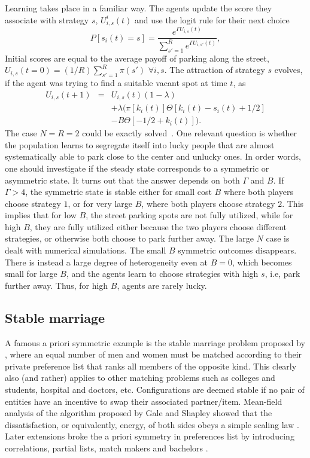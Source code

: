 \documentclass[aps,twocolumn,nofootinbib,sortedaddress,reprint]{revtex4-1}
\begin{document}
Learning takes place in a familiar way.  The agents update
the score they associate with strategy $s$,   $U_{i,s}^i(t)$ and use the logit rule for their next choice
\begin{equation}
P[s_i(t) = s]=\frac{e^{\Gamma U_{i,s}(t)}}{\sum_{s'=1}^R e^{\Gamma
  U_{i,s'}(t)}},
\end{equation}
Initial scores are equal to the average payoff of parking along the street, $U_{i,s}(t=0) =
(1/R) \sum_{s'=1}^R \pi(s')$ $\forall i,s$.  The attraction of
strategy $s$ evolves, if the agent was trying to find a suitable vacant spot at time $t$, as
\begin{eqnarray}
U_{i,s}(t+1)&=& U_{i,s}(t)(1-\lambda) \\\nonumber
&& + \lambda (\pi[k_i(t)]\Theta[k_i(t)-s_i(t)+1/2] \\\nonumber
&& -B\Theta [-1/2+k_i(t)]).
\end{eqnarray}
The case  $N=R=2$ could be exactly solved~\cite{Hanaki2011}. One relevant question is whether the
population learns to segregate itself into lucky people that are almost systematically able to park close to the center and unlucky ones. In order words, one should investigate if the steady state corresponds to a symmetric or asymmetric state. It turns out that the answer depends on both $\Gamma$ and $B$. If  $\Gamma > 4$, the
symmetric state is stable either for small cost $B$ where both players
choose strategy $1$, or for very large $B$, where both players choose
strategy $2$.  This implies that for low $B$, the street parking spots
are not fully utilized, while for high $B$, they are fully utilized
either because the two players choose different strategies, or
otherwise both choose to park further away. The large $N$ case is dealt with numerical simulations. The
small $B$ symmetric outcomes disappears. There is instead
a large degree of heterogeneity even at $B=0$, which becomes small
for large $B$, and the agents learn to choose strategies with high
$s$, i.e, park further away. Thus, for high $B$, agents are rarely lucky.



\subsection{Stable marriage}
\label{sec:marriage}
A famous a priori symmetric example is the stable marriage problem
proposed by \textcite{gale1962college}, \textcite{knuth1997stable} where an equal number of men
and women must be matched according to their private preference list
that ranks all members of the opposite kind. This clearly
  also (and rather) applies to other matching problems such as
  colleges and students, hospital and doctors, etc. Configurations
are deemed stable if no pair of entities have an incentive to swap
their associated partner/item.  Mean-field analysis of the algorithm proposed
by Gale and Shapley showed that the dissatisfaction, or equivalently,
energy, of both sides obeys a simple scaling law
\cite{omero1997marriage}. Later extensions broke the a priori symmetry
in preferences list by introducing correlations, partial lists, match
makers and bachelors
\cite{caldarelli2001beauty,zhang2001happier,laureti2003matching}.
\end{document}
